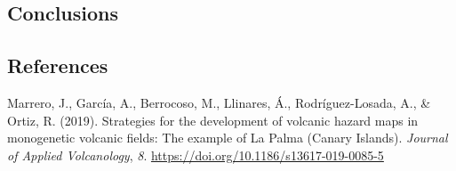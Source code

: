 \documentclass[
]{agujournal2019}
\newlength{\cslhangindent}
\newenvironment{CSLReferences}[2] %
 {\begin{list}{}{%
  \setlength{\itemindent}{0pt}
  \setlength{\leftmargin}{0pt}
  \setlength{\parsep}{0pt}
  \ifodd #1
   \setlength{\leftmargin}{\cslhangindent}
   \setlength{\itemindent}{-1\cslhangindent}
  \fi
  \setlength{\itemsep}{#2\baselineskip}}}
 {\end{list}}
\begin{document}
\subsection{Conclusions}\label{sec-conclusions}

\subsection*{References}\label{references}

\label{refs}
\begin{CSLReferences}{1}{0}
\vspace{1em}

Marrero, J., García, A., Berrocoso, M., Llinares, Á., Rodríguez-Losada,
A., \& Ortiz, R. (2019). Strategies for the development of volcanic
hazard maps in monogenetic volcanic fields: The example of {La} {Palma}
({Canary} {Islands}). \emph{Journal of Applied Volcanology}, \emph{8}.
\url{https://doi.org/10.1186/s13617-019-0085-5}

\end{CSLReferences}
\end{document}

